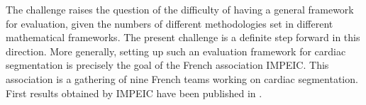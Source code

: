 \documentclass{llncs}
\begin{document}
The challenge raises the question of the difficulty of having a general
framework for evaluation, given the numbers of different methodologies set in
different mathematical frameworks. The present challenge is a definite step
forward in this direction. More generally, setting up such an evaluation
framework for cardiac segmentation is precisely the goal of the French
association IMPEIC. This association is a gathering of nine French teams working
on cardiac segmentation. First results obtained by IMPEIC have been published in
\cite{IMPEIC09}.

%
 

\end{document}
